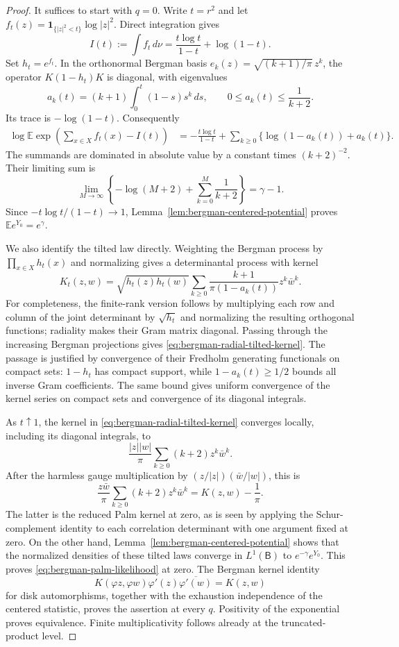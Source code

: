 \documentclass[11pt,a4paper]{article}
\numberwithin{equation}{section}
\theoremstyle{definition}
\theoremstyle{remark}
\newcommand{\E}{\mathbb E}
\newcommand{\ind}{\mathbf 1}
\begin{document}
\begin{proof}
It suffices to start with $q=0$.  Write $t=r^2$ and let
$f_t(z)=\ind_{\{|z|^2<t\}}\log|z|^2$.  Direct integration gives
\begin{equation}
 I(t):=\int f_t\,d\nu
 =\frac{t\log t}{1-t}+\log(1-t).
 \label{eq:bergman-log-centering}
\end{equation}
Set $h_t=e^{f_t}$.  In the orthonormal Bergman basis
$e_k(z)=\sqrt{(k+1)/\pi}\,z^k$, the operator $K(1-h_t)K$ is diagonal,
with eigenvalues
\[
 a_k(t)=(k+1)\int_0^t(1-s)s^k\,ds,
 \qquad 0\leq a_k(t)\leq\frac1{k+2}.
\]
Its trace is $-\log(1-t)$.  Consequently
\begin{align*}
 \log\E\exp\left(\sum_{x\in X}f_t(x)-I(t)\right)
 &= -\frac{t\log t}{1-t}
    +\sum_{k\geq0}\{\log(1-a_k(t))+a_k(t)\}.
\end{align*}
The summands are dominated in absolute value by a constant times
$(k+2)^{-2}$.  Their limiting sum is
\[
 \lim_{M\to\infty}
 \left\{-\log(M+2)+\sum_{k=0}^{M}\frac1{k+2}\right\}
 =\gamma-1.
\]
Since $-t\log t/(1-t)\to1$, Lemma~\ref{lem:bergman-centered-potential}
proves $\E e^{Y_0}=e^{\gamma}$.

We also identify the tilted law directly.  Weighting the Bergman process
by $\prod_{x\in X}h_t(x)$ and normalizing gives a determinantal process
with kernel
\begin{equation}
 K_t(z,w)=\sqrt{h_t(z)h_t(w)}
   \sum_{k\geq0}\frac{k+1}{\pi(1-a_k(t))}z^k\bar w^k.
 \label{eq:bergman-radial-tilted-kernel}
\end{equation}
For completeness, the finite-rank version follows by multiplying each
row and column of the joint determinant by $\sqrt{h_t}$ and normalizing
the resulting orthogonal functions; radiality makes their Gram matrix
diagonal.  Passing through the increasing Bergman projections gives
\eqref{eq:bergman-radial-tilted-kernel}.  The passage is justified by
convergence of their Fredholm generating functionals on compact sets:
$1-h_t$ has compact support, while $1-a_k(t)\geq1/2$ bounds all inverse
Gram coefficients.  The same bound gives uniform convergence of the
kernel series on compact sets and convergence of its diagonal integrals.

As $t\uparrow1$, the kernel in \eqref{eq:bergman-radial-tilted-kernel}
converges locally, including its diagonal integrals, to
\[
 \frac{|z||w|}{\pi}\sum_{k\geq0}(k+2)z^k\bar w^k.
\]
After the harmless gauge multiplication by
$(z/|z|)(\bar w/|w|)$, this is
\[
 \frac{z\bar w}{\pi}\sum_{k\geq0}(k+2)z^k\bar w^k
 =K(z,w)-\frac1\pi.
\]
The latter is the reduced Palm kernel at zero, as is seen by applying
the Schur-complement identity to each correlation determinant with one
argument fixed at zero.  On the other hand, Lemma~\ref{lem:bergman-centered-potential}
shows that the normalized densities of these tilted laws converge in
$L^1(\mathsf B)$ to $e^{-\gamma}e^{Y_0}$.  This proves
\eqref{eq:bergman-palm-likelihood} at zero.  The Bergman kernel identity
\[
 K(\varphi z,\varphi w)\varphi'(z)\overline{\varphi'(w)}=K(z,w)
\]
for disk automorphisms, together with the exhaustion independence of
the centered statistic, proves the assertion at every $q$.
Positivity of the exponential proves equivalence.  Finite
multiplicativity follows already at the truncated-product level.


\end{proof}
\end{document}
